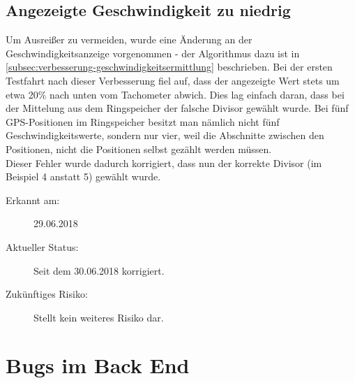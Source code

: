 \documentclass[12pt,a4paper,ngerman,enabledeprecatedfontcommands]{scrreprt}
\begin{document}
\subsection{Angezeigte Geschwindigkeit zu niedrig}
Um Ausreißer zu vermeiden, wurde eine Änderung an der Geschwindigkeitsanzeige vorgenommen - der Algorithmus dazu ist in \cref{subsec:verbesserung-geschwindigkeitsermittlung} beschrieben. Bei der ersten Testfahrt nach dieser Verbesserung fiel auf, dass der angezeigte Wert stets um etwa 20\% nach unten vom Tachometer abwich. Dies lag einfach daran, dass bei der Mittelung aus dem Ringspeicher der falsche Divisor gewählt wurde. Bei fünf GPS-Positionen im Ringspeicher besitzt man nämlich nicht fünf Geschwindigkeitswerte, sondern nur vier, weil die Abschnitte zwischen den Positionen, nicht die Positionen selbst gezählt werden müssen.\\
Dieser Fehler wurde dadurch korrigiert, dass nun der korrekte Divisor (im Beispiel 4 anstatt 5) gewählt wurde.

\begin{description}

    \item[Erkannt am:] 29.06.2018
    
    \item[Aktueller Status:] Seit dem 30.06.2018 korrigiert.
    
    \item[Zukünftiges Risiko:] Stellt kein weiteres Risiko dar.
    
\end{description}
\smallskip

\newpage
\section{Bugs im Back End}
\end{document}
